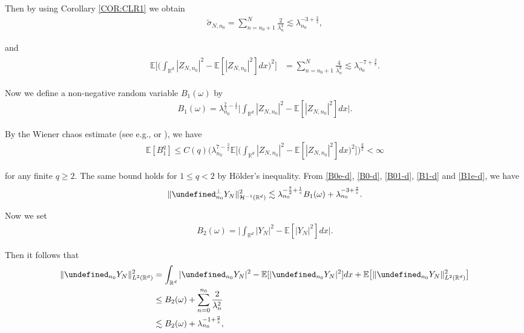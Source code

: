 \documentclass[%
11pt,  reqno]{amsart}
\theoremstyle{remarkstyle}
\newcommand{\1}{\hspace{0.2mm}\text{I}\hspace{0.2mm}}
\newcommand{\noi}{\noindent}
\newcommand{\R}{\mathbb{R}}
\let\P= \undefined
\newcommand{\P}{\mathbf{P}}
\newcommand{\E}{\mathbb{E}}
\newcommand{\ld}{\lambda}
\newcommand{\s}{\sigma}
\newcommand{\wt}{\widetilde}
\renewcommand{\o}{\omega}
\newcommand{\les}{\lesssim}
\numberwithin{equation}{section}
\numberwithin{theorem}{section}
\begin{document}
	\noi 
	Then by using Corollary \ref{COR:CLR1} we obtain
	\begin{align} 
		\label{B0-d}
		\wt \s_{N,n_0}  = \sum_{n= n_0+1}^N \frac2{\ld_n^4} \les \ld_{n_0}^{-3 + \frac2s},
	\end{align}
	
	\noi 
	and
	\begin{align}
		\label{B01-d}
		\begin{split}
			\E \bigg[ \Big( \int_{\R^d} |Z_{N,n_0}|^2- \E[|Z_{N,n_0}|^2] dx \Big)^2 \bigg] 
			& = \sum_{n = n_0+1}^N \frac4{\ld_n^8} \les \ld_{n_0}^{-7 + \frac2s}.    
		\end{split}
	\end{align}
	
	\noi  
	Now we define a non-negative random variable $B_1(\o)$ by
	\begin{align}
		\label{B1-d}
		B_1(\o) = \ld_{n_0}^{\frac72-\frac1s} \bigg| \int_{\R^d} |Z_{N,n_0}|^2- \E[|Z_{N,n_0}|^2] dx\bigg|. 
	\end{align}
	
	\noi 
	By the Wiener chaos estimate (see e.g., \cite[Theorem I.22]{Simon15} or \cite[Proposition 2.4]{TT10}), we have
	\begin{align}
		\label{B1e-d}
		\E [B_1^q] \le C(q)\bigg( \ld_{n_0}^{7-\frac2s} \E\bigg[\bigg( \int_{\R^d} |Z_{N,n_0}|^2 -\E[|Z_{N,n_0}|^2] dx\bigg)^2\bigg]\bigg)^{\frac{q}2} <\infty
	\end{align}
	
	\noi 
	for any finite $q\ge 2$. The same bound holds for $1\leq q<2$ by H\"older's inequality. From \eqref{B0e-d}, \eqref{B0-d}, \eqref{B01-d}, \eqref{B1-d} and \eqref{B1e-d},
	we have 
	\begin{align}
		\label{B1e2-d}
		\| \P^{\perp}_{n_0} Y_N \|_{\mathcal H^{-1}(\R^d)}^2 \les \ld_{n_0}^{- \frac72 + \frac1s}  B_1(\o) + \ld_{n_0}^{-3+\frac2s}. 
	\end{align}
	
	
	
	
	Now we set 
	\begin{align}
		\label{B2-d}
		B_2(\o) =\bigg| \int_{\R^d} |Y_N|^2 - \E[|Y_N|^2] dx \bigg|.
	\end{align}
	
	\noi 
	Then it follows that
	\begin{align}
		\label{B2e-d}
		\begin{split}
			\|\P_{n_0} Y_N \|_{L^2(\R^d)}^2 &=\int_{\R^d} |\P_{n_0} Y_N|^2 - \E[|\P_{n_0} Y_N|^2] dx +  \E \big[\|\P_{n_0}Y_N \|_{L^2(\R^d)}^2\big] \\
			& \le B_2 (\o) + \sum_{n=0}^{n_0} \frac2{\ld_n^2} \\
			& \les B_2(\o) + \ld_{n_0}^{-1 + \frac2s},
		\end{split}
	\end{align}
	
\end{document}
